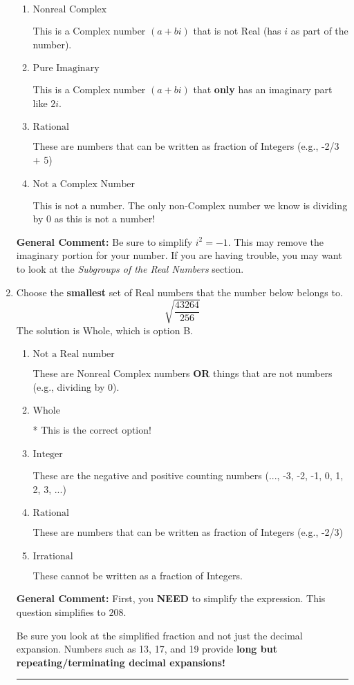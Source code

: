 \documentclass{extbook}[14pt]
\newcommand{\litem}[1]{\item #1

\rule{\textwidth}{0.4pt}}
\begin{document}
\begin{enumerate}
{\begin{enumerate}[label=\Alph*.]
* This is the correct option!
\item \( \text{Nonreal Complex} \)

This is a Complex number $(a+bi)$ that is not Real (has $i$ as part of the number).
\item \( \text{Pure Imaginary} \)

This is a Complex number $(a+bi)$ that \textbf{only} has an imaginary part like $2i$.
\item \( \text{Rational} \)

These are numbers that can be written as fraction of Integers (e.g., -2/3 + 5)
\item \( \text{Not a Complex Number} \)

This is not a number. The only non-Complex number we know is dividing by 0 as this is not a number!
\end{enumerate}

\textbf{General Comment:} Be sure to simplify $i^2 = -1$. This may remove the imaginary portion for your number. If you are having trouble, you may want to look at the \textit{Subgroups of the Real Numbers} section.
}
\litem{
Choose the \textbf{smallest} set of Real numbers that the number below belongs to.
\[ \sqrt{\frac{43264}{256}} \]
The solution is \( \text{Whole} \), which is option B.\begin{enumerate}[label=\Alph*.]
\item \( \text{Not a Real number} \)

These are Nonreal Complex numbers \textbf{OR} things that are not numbers (e.g., dividing by 0).
\item \( \text{Whole} \)

* This is the correct option!
\item \( \text{Integer} \)

These are the negative and positive counting numbers (..., -3, -2, -1, 0, 1, 2, 3, ...)
\item \( \text{Rational} \)

These are numbers that can be written as fraction of Integers (e.g., -2/3)
\item \( \text{Irrational} \)

These cannot be written as a fraction of Integers.
\end{enumerate}

\textbf{General Comment:} First, you \textbf{NEED} to simplify the expression. This question simplifies to $208$. 
 
 Be sure you look at the simplified fraction and not just the decimal expansion. Numbers such as 13, 17, and 19 provide \textbf{long but repeating/terminating decimal expansions!} 
 
}
\end{enumerate}
\end{document}
